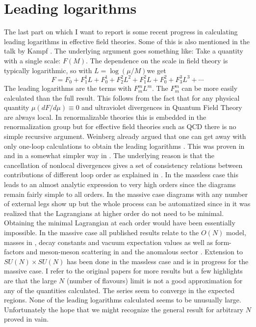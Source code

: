 \documentclass[cits,hyper]{PoS}
\begin{document}
\section{Leading logarithms}

The last part on which I want to report is some recent progress
in calculating leading logarithms in effective field theories.
Some of this is also mentioned in the talk by Kampf \cite{Kampf}.
The underlying argument goes something like:
Take a quantity with a single scale: $F(M)$.
The dependence on the scale in field theory is typically
logarithmic, so with $L=\log\left(\mu/M\right)$we get
\begin{equation}
F= F_0 + F_1^1 {L} + F^1_0 + F_2^2{ L^2} + F^2_1 L + F^2_0 
+ F_3^3{ L^3}
 +\cdots
\end{equation}
The leading logarithms are the terms with $F_m^m{ L^m}$.
The $F_m^m$ can be more easily calculated than the
 full result. This follows from the fact that for any physical quantity
$\mu\left( dF/d\mu\right)\equiv 0$ and 
ultraviolet divergences in Quantum Field Theory are always local.
In renormalizable theories this is embedded in the renormalization group but for
effective field theories such as QCD there is no simple recursive argument.
Weinberg already argued that one can get away with only one-loop calculations
to obtain the leading logarithms \cite{Weinberg0}. This was proven in \cite{BC0} and in a somewhat simpler way in \cite{BC1}. The underlying reason is that the cancellation of nonlocal divergences gives a set of consistency relations
between contributions of different loop order as explained in \cite{BCEGS}.
In the massless case \cite{Polyakov1,Polyakov2,Polyakov3} this leads to
an almost analytic expression to very high orders since the diagrams remain
fairly simple to all orders. In the massive case diagrams with any number of
external legs show up but the whole process can be automatized since
in \cite{BC1} it was realized that the Lagrangians at higher order do not need
to be minimal. Obtaining the minimal Lagrangian at each order would have been
essentially impossible. In the massive case all published results relate to
the $O(N)$ model, masses in \cite{BC1}, decay constants and vacuum expectation
values as well as form-factors and meson-meson scattering in \cite{BC2} and
the anomalous sector \cite{BKL}. Extension to $SU(N)\times SU(N)$ has been
done in the massless case \cite{Polyakov3} and is in progress for the massive
case.
I refer to the original papers for more results but a few highlights are
that the large $N$ (number of flavours) limit is not a good approximation
for any of the quantities calculated. The series seem to converge
in the expected regions. None of the leading logarithms calculated seems
to be unusually large. Unfortunately the hope that we might recognize
the general result for arbitrary $N$ proved in vain.
\end{document}

